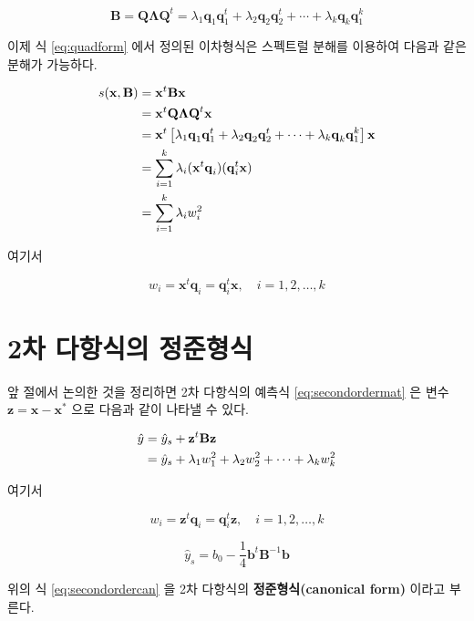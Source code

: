 \documentclass[
]{book}
\newcommand{\bm}[1]{\boldsymbol{\mathbf{#1}}}
\theoremstyle{definition}
\theoremstyle{definition}
\theoremstyle{definition}
\theoremstyle{definition}
\theoremstyle{remark}
\begin{document}
\begin{equation}
\bm B = \bm Q \bm \Lambda {\bm Q}^t = \lambda_1 \bm q_1 \bm q_1^t + \lambda_2 \bm q_2 \bm q_2^t 
+ \cdots + \lambda_k \bm q_k \bm q_1^k
\label{eq:specdecomp}
\end{equation}

이제 식 \eqref{eq:quadform} 에서 정의된 이차형식은 스펙트럴 분해를 이용하여 다음과 같은
분해가 가능하다.

\begin{align}
s(\bm x, \bm B) & = {\bm x}^t \bm B \bm x \notag \\
    & = {\bm x}^t \bm Q \bm \Lambda {\bm Q}^t \bm x \notag \\
    &= {\bm x}^t  \left [ \lambda_1 \bm q_1 \bm q_1^t + \lambda_2 \bm q_2 \bm q_2^t 
+ \cdots + \lambda_k \bm q_k \bm q_1^k \right ] \bm x \notag \\
& = \sum_{i=1}^k \lambda_i  ( {\bm x}^t \bm q_i)  (\bm q_i^t \bm x) \notag  \\
 & = \sum_{i=1}^k \lambda_i w_i^2 \label{eq:quadform2}
\end{align}

여기서

\[ w_i = {\bm x}^t \bm q_i = \bm q_i^t \bm x, \quad i=1,2,\dots, k \]

\hypertarget{uxcc28-uxb2e4uxd56duxc2dduxc758-uxc815uxc900uxd615uxc2dd}{%
\section{2차 다항식의 정준형식}\label{uxcc28-uxb2e4uxd56duxc2dduxc758-uxc815uxc900uxd615uxc2dd}}

앞 절에서 논의한 것을 정리하면 2차 다항식의 예측식 \eqref{eq:secondordermat} 은 변수 \(\bm z = \bm x - {\bm x}^*\) 으로 다음과 같이 나타낼 수 있다.

\begin{align}
\hat y & = \hat y_s +   {\bm z}^t \bm B  {\bm z}  \notag \\
  & = \hat y_s + \lambda_1 w_1^2 + \lambda_2 w_2^2 + \cdots + \lambda_k w_k^2
\label{eq:secondordercan}
\end{align}

여기서

\[w_i = {\bm z}^t \bm q_i = \bm q_i^t \bm z, \quad i=1,2,\dots, k \]

\[ \hat y_s =   b_0 - \frac{1}{4} {\bm b}^t {\bm B}^{-1}{\bm b} \]

위의 식 \eqref{eq:secondordercan} 을 2차 다항식의 \textbf{정준형식(canonical form)} 이라고 부른다.
\end{document}
